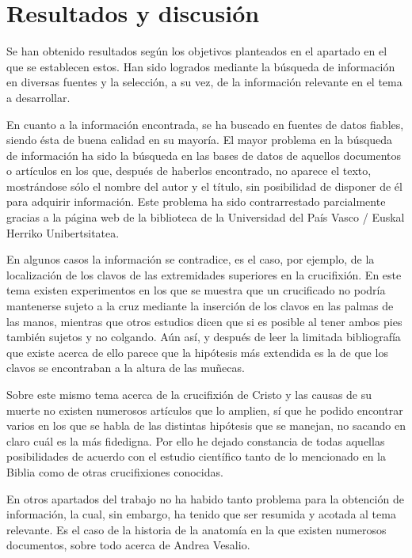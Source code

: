 \section{Resultados y discusión}

Se han obtenido resultados según los objetivos planteados en el apartado en el que se establecen estos. Han sido logrados mediante la búsqueda de información en diversas fuentes y la selección, a su vez, de la información relevante en el tema a desarrollar.

En cuanto a la información encontrada, se ha buscado en fuentes de datos fiables, siendo ésta de buena calidad en su mayoría. El mayor problema en la búsqueda de información ha sido la búsqueda en las bases de datos de aquellos documentos o artículos en los que, después de haberlos encontrado, no aparece el texto, mostrándose sólo el nombre del autor y el título, sin posibilidad de disponer de él para adquirir información. Este problema ha sido contrarrestado parcialmente gracias a la página web de la biblioteca de la Universidad del País Vasco / Euskal Herriko Unibertsitatea.

En algunos casos la información se contradice, es el caso, por ejemplo, de la localización de los clavos de las extremidades superiores en la crucifixión. En este tema existen experimentos en los que se muestra que un crucificado no podría mantenerse sujeto a la cruz mediante la inserción de los clavos en las palmas de las manos, mientras que otros estudios dicen que si es posible al tener ambos pies también sujetos y no colgando. Aún así, y después de leer la limitada bibliografía que existe acerca de ello parece que la hipótesis más extendida es la de que los clavos se encontraban a la altura de las muñecas.

Sobre este mismo tema acerca de la crucifixión de Cristo y las causas de su muerte no existen numerosos artículos que lo amplien, sí que he podido encontrar varios en los que se habla de las distintas hipótesis que se manejan, no sacando en claro cuál es la más fidedigna. Por ello he dejado constancia de todas aquellas posibilidades de acuerdo con el estudio científico tanto de lo mencionado en la Biblia como de otras crucifixiones conocidas.

En otros apartados del trabajo no ha habido tanto problema para la obtención de información, la cual, sin embargo, ha tenido que ser resumida y acotada al tema relevante. Es el caso de la historia de la anatomía en la que existen numerosos documentos, sobre todo acerca de Andrea Vesalio.

